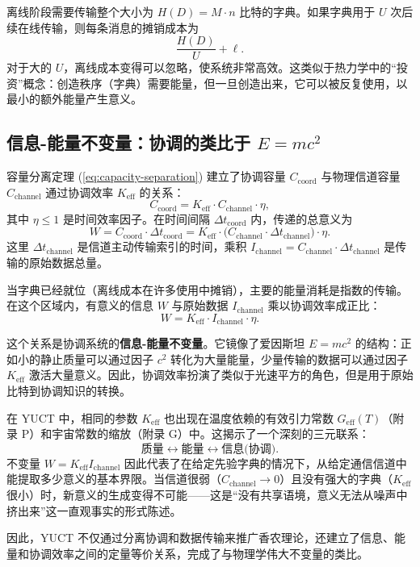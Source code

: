 \documentclass[12pt,a4paper]{article}
\theoremstyle{remark}
\begin{document}
	离线阶段需要传输整个大小为 $H(D) = M \cdot n$ 比特的字典。如果字典用于 $U$ 次后续在线传输，则每条消息的摊销成本为
	\[
	\frac{H(D)}{U} + \ell.
	\]
	对于大的 $U$，离线成本变得可以忽略，使系统非常高效。这类似于热力学中的“投资”概念：创造秩序（字典）需要能量，但一旦创造出来，它可以被反复使用，以最小的额外能量产生意义。
	
	\subsection{信息-能量不变量：协调的类比于 \(E=mc^2\)}
	\label{subsec:info_energy_invariant}
	
	容量分离定理 (\ref{eq:capacity-separation}) 建立了协调容量 \(C_{\text{coord}}\) 与物理信道容量 \(C_{\text{channel}}\) 通过协调效率 \(K_{\mathrm{eff}}\) 的关系：
	\[
	C_{\text{coord}} = K_{\mathrm{eff}} \cdot C_{\text{channel}} \cdot \eta,
	\]
	其中 \(\eta \le 1\) 是时间效率因子。在时间间隔 \(\Delta t_{\text{coord}}\) 内，传递的总意义为
	\[
	W = C_{\text{coord}} \cdot \Delta t_{\text{coord}} = K_{\mathrm{eff}} \cdot \bigl( C_{\text{channel}} \cdot \Delta t_{\text{channel}} \bigr) \cdot \eta.
	\]
	这里 \(\Delta t_{\text{channel}}\) 是信道主动传输索引的时间，乘积 \(I_{\text{channel}} = C_{\text{channel}} \cdot \Delta t_{\text{channel}}\) 是传输的原始数据总量。
	
	当字典已经就位（离线成本在许多使用中摊销），主要的能量消耗是指数的传输。在这个区域内，有意义的信息 \(W\) 与原始数据 \(I_{\text{channel}}\) 乘以协调效率成正比：
	\[
	\boxed{W = K_{\mathrm{eff}} \cdot I_{\text{channel}} \cdot \eta}.
	\]
	
	这个关系是协调系统的\textbf{信息-能量不变量}。它镜像了爱因斯坦 \(E = m c^2\) 的结构：正如小的静止质量可以通过因子 \(c^2\) 转化为大量能量，少量传输的数据可以通过因子 \(K_{\mathrm{eff}}\) 激活大量意义。因此，协调效率扮演了类似于光速平方的角色，但是用于原始比特到协调知识的转换。
	
	在 YUCT 中，相同的参数 \(K_{\mathrm{eff}}\) 也出现在温度依赖的有效引力常数 \(G_{\text{eff}}(T)\)（附录 P）和宇宙常数的缩放（附录 G）中。这揭示了一个深刻的三元联系：
	\[
	\text{质量} \leftrightarrow \text{能量} \leftrightarrow \text{信息(协调)}.
	\]
	不变量 \(W = K_{\mathrm{eff}} I_{\text{channel}}\) 因此代表了在给定先验字典的情况下，从给定通信信道中能提取多少意义的基本界限。当信道很弱（\(C_{\text{channel}} \to 0\)）且没有强大的字典（\(K_{\mathrm{eff}}\) 很小）时，新意义的生成变得不可能——这是“没有共享语境，意义无法从噪声中挤出来”这一直观事实的形式陈述。
	
	因此，YUCT 不仅通过分离协调和数据传输来推广香农理论，还建立了信息、能量和协调效率之间的定量等价关系，完成了与物理学伟大不变量的类比。
	
\end{document}
